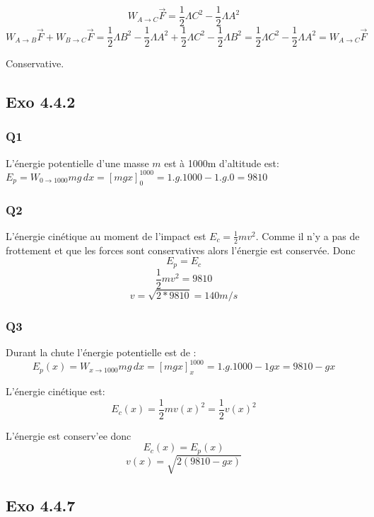 \documentclass[]{book}
\theoremstyle{definition}
\begin{document}
$$W_{A \to C}\overrightarrow{F} = \frac{1}{2}\Lambda C^2 - \frac{1}{2}\Lambda A^2$$
$$W_{A \to B}\overrightarrow{F} + W_{B \to C}\overrightarrow{F} = \frac{1}{2}\Lambda B^2 - \frac{1}{2}\Lambda A^2 + \frac{1}{2}\Lambda C^2 - \frac{1}{2}\Lambda B^2 = \frac{1}{2}\Lambda C^2 - \frac{1}{2}\Lambda A^2 = W_{A \to C}\overrightarrow{F}$$

Conservative.

\subsection*{Exo 4.4.2}
\subsubsection{Q1}
L'\'energie potentielle d'une masse $m$ est \`a 1000m d'altitude est:
$E_p = W_{0 \to 1000} mg\, dx = [mgx]_0^{1000} = 1.g.1000 - 1.g.0 = 9810$

\subsubsection{Q2}
L'\'energie cin\'etique au moment de l'impact est $E_c = \frac{1}{2}mv^2$. Comme il n'y a pas de frottement et que les forces sont conservatives alors l'\'energie est conserv\'ee. Donc 
$$E_p = E_c$$
$$\frac{1}{2}mv^2 = 9810$$
$$v = \sqrt{2*9810} = 140 m/s$$

\subsubsection{Q3}
Durant la chute l'\'energie potentielle est de :
$$E_p(x) = W_{x \to 1000} mg\, dx = [mgx]_x^{1000} = 1.g.1000 - 1gx = 9810 - gx$$

L'\'energie cin\'etique est:
$$E_c(x) = \frac{1}{2}mv(x)^2 = \frac{1}{2}v(x)^2$$

L'\'energie est conserv'ee donc
$$E_c(x) = E_p(x)$$
$$v(x) = \sqrt{2(9810 - gx)}$$


\subsection*{Exo 4.4.7}
\end{document}
